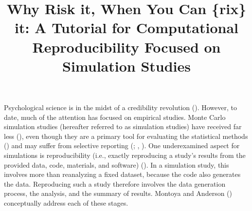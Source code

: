 \documentclass[
  man,
  longtable,
  nolmodern,
  notxfonts,
  notimes,
  colorlinks=true,linkcolor=blue,citecolor=blue,urlcolor=blue]{apa7}
\title{Why Risk it, When You Can \{rix\} it: A Tutorial for
Computational Reproducibility Focused on Simulation Studies}
\begin{document}
\maketitle




\setlength\LTleft{0pt}




Psychological science is in the midst of a credibility revolution
(). However, to date, much of the
attention has focused on empirical studies. Monte Carlo simulation
studies (hereafter referred to as simulation studies) have received far
less (), even though
they are a primary tool for evaluating the statistical methods
() and may suffer
from selective reporting (; ,
). One underexamined aspect for
simulations is reproducibility (i.e., exactly reproducing a study's
results from the provided data, code, materials, and software)
(). In a simulation
study, this involves more than reanalyzing a fixed dataset, because the
code also generates the data. Reproducing such a study therefore
involves the data generation process, the analysis, and the summary of
results. Montoya and Anderson
() conceptually address each
of these stages.
\end{document}
